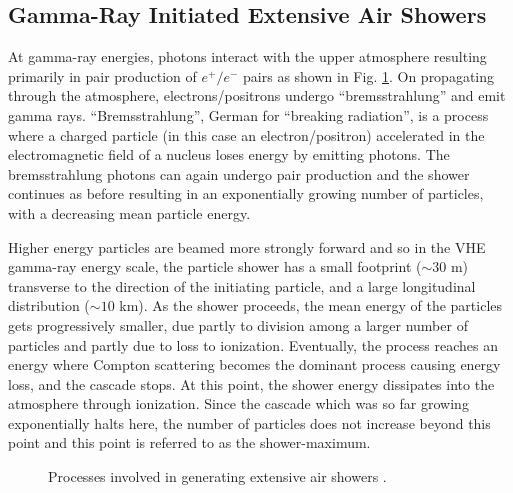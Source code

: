 \documentclass[main.tex]{subfiles}
\begin{document}
\subsection{Gamma-Ray Initiated Extensive Air Showers}
\label{Gamma-ray-EAS}
At gamma-ray energies, photons interact with the upper atmosphere resulting primarily in pair production of $e^+/e^-$ pairs as shown in Fig. \ref{fig:EAS_img}. On propagating through the atmosphere, electrons/positrons undergo ``bremsstrahlung'' and emit gamma rays. ``Bremsstrahlung'', German for ``breaking radiation'', is a process where a charged particle (in this case an electron/positron) accelerated in the electromagnetic field of a nucleus loses energy by emitting photons. The bremsstrahlung photons can again undergo pair production and the shower continues as before resulting in an exponentially growing number of particles, with a decreasing mean particle energy. \par
Higher energy particles are beamed more strongly forward and so in the VHE gamma-ray energy scale, the particle shower has a small footprint ($\sim 30$ m) transverse to the direction of the initiating particle, and a large longitudinal distribution ($\sim10$ km). As the shower proceeds, the mean energy of the particles gets progressively smaller, due partly to division among a larger number of particles and partly due to loss to ionization. Eventually, the process reaches an energy where Compton scattering becomes the dominant process causing energy loss, and the cascade stops. At this point, the shower energy dissipates into the atmosphere through ionization. Since the cascade which was so far growing exponentially halts here, the number of particles does not increase beyond this point and this point is referred to as the shower-maximum.
\begin{figure}[htbp]
  \centering
  \caption[Processes involved in generating extensive air showers.]{Processes involved in generating extensive air showers \cite{EAS_2018}.}
  \label{fig:EAS_img}
\end{figure}
\end{document}

